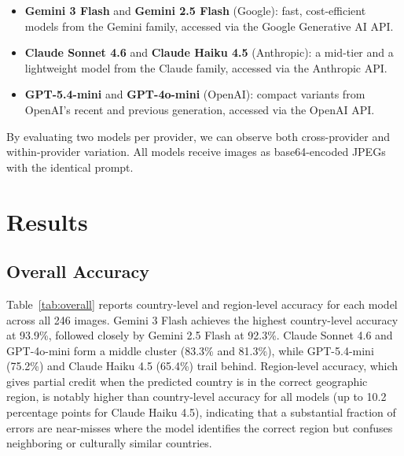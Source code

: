 \documentclass[twoside,11pt]{article}
\begin{document}
\begin{itemize}
    \item \textbf{Gemini 3 Flash} and \textbf{Gemini 2.5 Flash} (Google): fast, cost-efficient models from the Gemini family, accessed via the Google Generative AI API.
    \item \textbf{Claude Sonnet 4.6} and \textbf{Claude Haiku 4.5} (Anthropic): a mid-tier and a lightweight model from the Claude family, accessed via the Anthropic API.
    \item \textbf{GPT-5.4-mini} and \textbf{GPT-4o-mini} (OpenAI): compact variants from OpenAI's recent and previous generation, accessed via the OpenAI API.
\end{itemize}

By evaluating two models per provider, we can observe both cross-provider and within-provider variation. All models receive images as base64-encoded JPEGs with the identical prompt.

\section{Results}
\label{sec:results}

\subsection{Overall Accuracy}

Table~\ref{tab:overall} reports country-level and region-level accuracy for each model across all 246 images. Gemini 3 Flash achieves the highest country-level accuracy at 93.9\%, followed closely by Gemini 2.5 Flash at 92.3\%. Claude Sonnet 4.6 and GPT-4o-mini form a middle cluster (83.3\% and 81.3\%), while GPT-5.4-mini (75.2\%) and Claude Haiku 4.5 (65.4\%) trail behind. Region-level accuracy, which gives partial credit when the predicted country is in the correct geographic region, is notably higher than country-level accuracy for all models (up to 10.2 percentage points for Claude Haiku 4.5), indicating that a substantial fraction of errors are near-misses where the model identifies the correct region but confuses neighboring or culturally similar countries.
\end{document}
